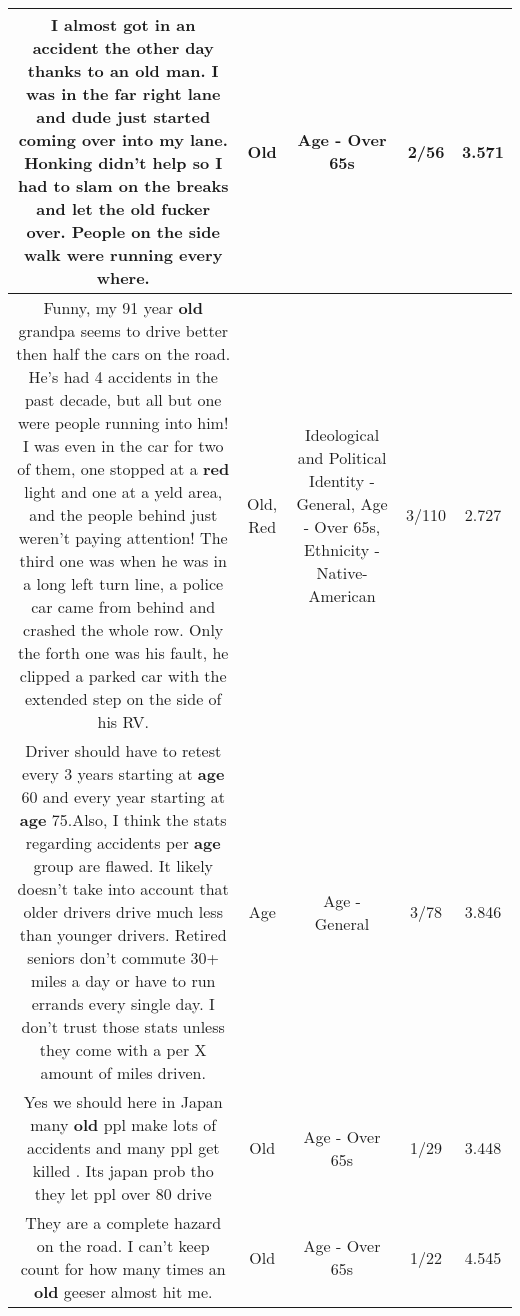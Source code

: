 \documentclass[11pt]{article}
\newlength\mylength
\begin{document}
\begin{center}
\begin{longtable}{|C{.65\mylength}|C{.30\mylength}|C{.12\mylength}|C{.12\mylength}|C{.12\mylength}|}
  \small I almost got in an accident the other day thanks to an \textbf{old} man. I was in the far right lane and dude just started coming over into my lane. Honking didn't help so I had to slam on the breaks and let the \textbf{old} fucker over. People on the side walk were running every where.\normalsize   & Old & Age - Over 65s & 2/56 & 3.571 \\  \hline
  \small Funny, my 91 year \textbf{old} grandpa seems to drive better then half the cars on the road.  He's had 4 accidents in the past decade, but all but one were people running into him!  I was even in the car for two of them, one stopped at a \textbf{r\textbf{ed}} light and one at a yeld area, and the people behind just weren't paying attention!  The third one was when he was in a long left turn line, a police car came from behind and crashed the whole row.  Only the forth one was his fault, he clipped a parked car with the extended step on the side of his RV.\normalsize   & Old, Red &  Ideological and Political Identity - General, Age - Over 65s, Ethnicity - Native-American & 3/110 & 2.727 \\  \hline
  \small Driver should have to retest every 3 years starting at \textbf{age} 60 and every year starting at \textbf{age} 75.Also, I think the stats regarding accidents per \textbf{age} group are flawed. It likely doesn't take into account that older drivers drive much less than younger drivers. Retired seniors don't commute 30+ miles a day or have to run errands every single day. I don't trust those stats unless they come with a per X amount of miles driven.\normalsize   & Age & Age - General & 3/78 & 3.846 \\  \hline
  \small Yes we should here in Japan many \textbf{old} ppl make lots of accidents and many ppl get killed . Its japan prob tho they let ppl over 80 drive\normalsize   & Old & Age - Over 65s & 1/29 & 3.448 \\  \hline
  \small They are a complete hazard on the road. I can't keep count for how many times an \textbf{old} geeser almost hit me.\normalsize   & Old & Age - Over 65s & 1/22 & 4.545 \\  \hline

\end{longtable}
\end{center}
\end{document}
